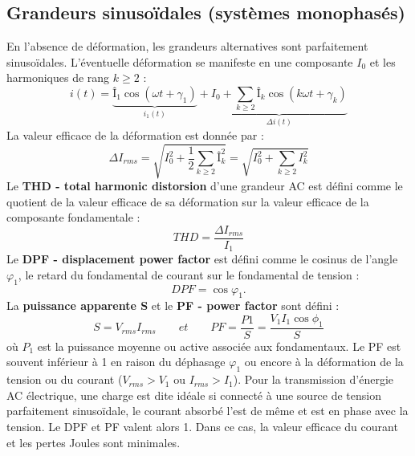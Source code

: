 	\subsection{Grandeurs sinusoïdales (systèmes monophasés)}
		En l'absence de déformation, les grandeurs alternatives sont parfaitement sinusoïdales. L'éventuelle déformation se manifeste en une composante $I_0$ et les harmoniques de rang $k\geq 2$ :
		\begin{equation}
			i(t) = \underbrace{Î_1\cos (\omega t+\gamma _1)}_{i_1(t)} + \underbrace{I_0 + \sum _ {k\geq 2} Î_k \cos (k\omega t + \gamma _k)}_{\Delta i(t)}
		\end{equation}
		La valeur efficace de la déformation est donnée par : 
		\begin{equation}
			\Delta I_{rms} = \sqrt{I_0^2+\frac{1}{2}\sum _{k\geq 2} Î_k^2} = \sqrt{I_0^2+ \sum _{k\geq 2} I_k^2}
		\end{equation}
		Le \textbf{THD - total harmonic distorsion} d'une grandeur AC est défini comme le quotient de la valeur efficace de sa déformation sur la valeur efficace de la composante fondamentale :
		\begin{equation}
			THD = \frac{\Delta I_{rms}}{I_1}
		\end{equation}
		Le \textbf{DPF - displacement power factor} est défini comme le cosinus de l'angle $\varphi _1$, le retard du fondamental de courant sur le fondamental de tension : 
		\begin{equation}
			DPF = \cos \varphi _1.
		\end{equation}
		La \textbf{puissance apparente S} et le \textbf{PF - power factor} sont défini :
		\begin{equation}
			S = V_{rms}I_{rms} \qquad et \qquad PF = \frac{P1}{S} = \frac{V_1I_1\cos \phi _1}{S}
		\end{equation}
		où $P_1$ est la puissance moyenne ou active associée aux fondamentaux. Le PF est souvent inférieur à 1 en raison du déphasage $\varphi _1$ ou encore à la déformation de la tension ou du courant ($V_{rms}>V_1$ ou $I_{rms}>I_1$). Pour la transmission d'énergie AC électrique, une charge est dite idéale si connecté à une source de tension parfaitement sinusoïdale, le courant absorbé l'est de même et est en phase avec la tension. Le DPF et PF valent alors 1. Dans ce cas, la valeur efficace du courant et les pertes Joules sont minimales. 
		

